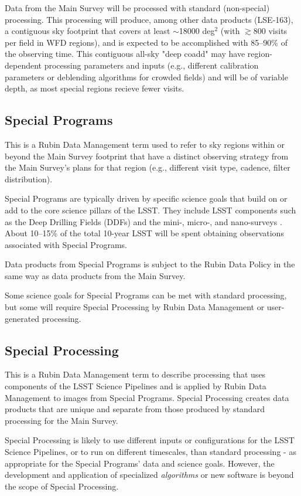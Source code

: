 Data from the Main Survey will be processed with standard (non-special) processing.
This processing will produce, among other data products (LSE-163), 
a contiguous sky footprint that covers at 
least $\sim$18000 deg$^2$ (with $\gtrsim$800 visits per field in WFD regions), 
and is expected to be accomplished with 85--90\% of the observing time.
This contiguous all-sky "deep coadd" may have region-dependent processing parameters and inputs
(e.g., different calibration parameters or deblending algorithms for crowded fields)
and will be of variable depth, as most special regions recieve fewer visits.

\subsection{Special Programs} 

This is a Rubin Data Management term used to refer to sky regions within
or beyond the Main Survey footprint that have a distinct observing strategy from
the Main Survey's plans for that region (e.g., different visit type, cadence, filter distribution).

Special Programs are typically driven by specific science goals that build on or 
add to the core science pillars of the LSST.
They include LSST components such as the Deep Drilling 
Fields (DDFs) and the mini-, micro-, and nano-surveys .
About 10--15\% of the total 10-year LSST will be spent obtaining 
observations associated with Special Programs.

Data products from Special Programs is subject to the Rubin Data Policy 
in the same way as data products from the Main Survey.

Some science goals for Special Programs can be met with standard processing,
but some will require Special Processing by Rubin Data Management or user-generated processing.

\subsection{Special Processing}

This is a Rubin Data Management term to describe processing that 
uses components of the LSST Science Pipelines and is applied by Rubin
Data Management to images from Special Programs.
Special Processing creates data products that are unique and separate from those produced
by standard processing for the Main Survey.

Special Processing is likely to use different inputs or configurations for the
LSST Science Pipelines, or to run on different timescales, than standard processing - 
as appropriate for the Special Programs' data and science goals.
However, the development and application of specialized \emph{algorithms} or new software
is beyond the scope of Special Processing.

